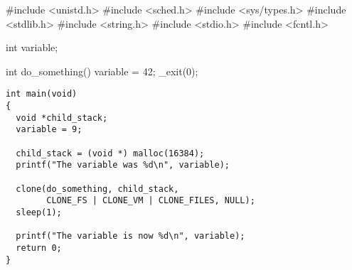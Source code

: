 \documentclass[varwidth=38em,crop]{standalone}
\begin{document}
\begin{minipage}{.32\linewidth}
\begin{ccode}
#include <unistd.h> 
#include <sched.h> 
#include <sys/types.h> 
#include <stdlib.h> 
#include <string.h> 
#include <stdio.h> 
#include <fcntl.h>
 
int variable;
 
int do_something()
{
  variable = 42;
  _exit(0);
}
\end{ccode}  
\end{minipage}\hfill
\begin{minipage}{.65\linewidth}
\begin{verbatim}
int main(void)
{
  void *child_stack;
  variable = 9;

  child_stack = (void *) malloc(16384);
  printf("The variable was %d\n", variable);
   
  clone(do_something, child_stack,
        CLONE_FS | CLONE_VM | CLONE_FILES, NULL);
  sleep(1);
 
  printf("The variable is now %d\n", variable);
  return 0;
}
\end{verbatim}
\end{minipage}
\end{document}

